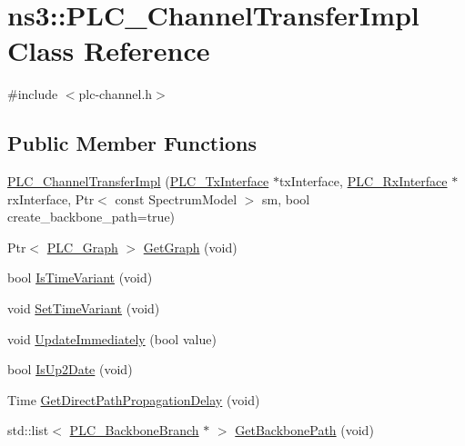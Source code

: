 \hypertarget{classns3_1_1PLC__ChannelTransferImpl}{\section{ns3\-:\-:\-P\-L\-C\-\_\-\-Channel\-Transfer\-Impl \-Class \-Reference}
\label{classns3_1_1PLC__ChannelTransferImpl}
}


{\ttfamily \#include $<$plc-\/channel.\-h$>$}

\subsection*{\-Public \-Member \-Functions}
\begin{DoxyCompactItemize}
\item 
\hyperlink{classns3_1_1PLC__ChannelTransferImpl_a17b06fd2fd82ff75ac601dd8c4d1e94d}{\-P\-L\-C\-\_\-\-Channel\-Transfer\-Impl} (\hyperlink{classns3_1_1PLC__TxInterface}{\-P\-L\-C\-\_\-\-Tx\-Interface} $\ast$tx\-Interface, \hyperlink{classns3_1_1PLC__RxInterface}{\-P\-L\-C\-\_\-\-Rx\-Interface} $\ast$rx\-Interface, \-Ptr$<$ const \-Spectrum\-Model $>$ sm, bool create\-\_\-backbone\-\_\-path=true)
\item 
\-Ptr$<$ \hyperlink{classns3_1_1PLC__Graph}{\-P\-L\-C\-\_\-\-Graph} $>$ \hyperlink{classns3_1_1PLC__ChannelTransferImpl_a303d12a4e2c3a6fe9318d0ea8c6a5e70}{\-Get\-Graph} (void)
\item 
bool \hyperlink{classns3_1_1PLC__ChannelTransferImpl_a0df21d5b8842358a4f8e23ee07dc0fdd}{\-Is\-Time\-Variant} (void)
\item 
void \hyperlink{classns3_1_1PLC__ChannelTransferImpl_a1eefbd6435b696a41c0738e3cdbe8395}{\-Set\-Time\-Variant} (void)
\item 
void \hyperlink{classns3_1_1PLC__ChannelTransferImpl_af5fa36c7ec01d2bfc16f8f83da0657ed}{\-Update\-Immediately} (bool value)
\item 
bool \hyperlink{classns3_1_1PLC__ChannelTransferImpl_a1c2c55cbc8fee287bb9957f7280ba06c}{\-Is\-Up2\-Date} (void)
\item 
\-Time \hyperlink{classns3_1_1PLC__ChannelTransferImpl_a539f73d6fc92df3b47fb8dc6f45f4e30}{\-Get\-Direct\-Path\-Propagation\-Delay} (void)
\item 
std\-::list$<$ \hyperlink{classns3_1_1PLC__BackboneBranch}{\-P\-L\-C\-\_\-\-Backbone\-Branch} $\ast$ $>$ \hyperlink{classns3_1_1PLC__ChannelTransferImpl_afe4bfef3bb7327c230a797fb8f0a0cfa}{\-Get\-Backbone\-Path} (void)

\end{DoxyCompactItemize}
